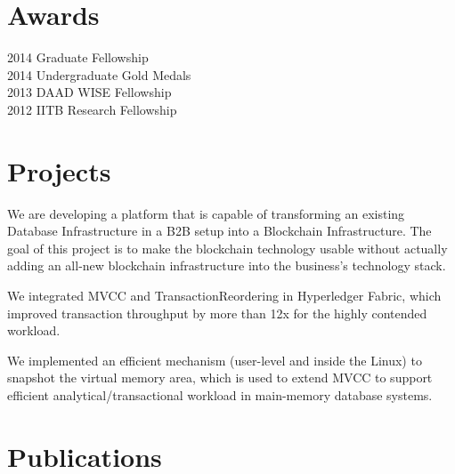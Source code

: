 \documentclass[]{deedy-resume-openfont}
\begin{document}
\begin{minipage}[t]{0.33\textwidth}
\section{Awards}
2014 \textbullet{}  Graduate Fellowship \\
2014 \textbullet{}  Undergraduate Gold Medals \\
2013 \textbullet{} DAAD WISE Fellowship \\
2012 \textbullet{} IITB Research Fellowship
\sectionsep

%
%

\end{minipage} 
\hfill
\begin{minipage}[t]{0.66\textwidth} 


\section{Projects}
We are developing a platform that is capable of transforming an existing Database Infrastructure in a B2B setup into a Blockchain Infrastructure. The goal of this project is to make the blockchain technology usable without actually adding an all-new blockchain infrastructure into the business's technology stack.
\sectionsep

We integrated MVCC and TransactionReordering in Hyperledger Fabric, which improved transaction throughput by more than 12x for the highly contended workload.
\sectionsep

We implemented an efficient mechanism (user-level and inside the Linux) to snapshot the virtual memory area, which is used to extend MVCC to support efficient analytical/transactional workload in main-memory database systems.


\section{Publications} 
\vspace*{0.8cm}
\renewcommand\refname{\vskip -1.5cm} %


\nocite{*}



\end{minipage}
\end{document}
